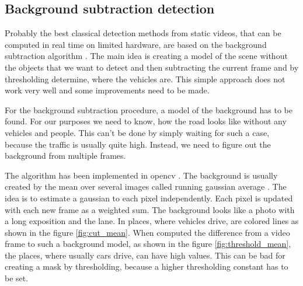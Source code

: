 \documentclass[a4paper,12pt,titlepage, twoside]{article}
\numberwithin{figure}{section}
\begin{document}
\subsection{Background subtraction detection}
\label{sec:bgs}

Probably the best classical detection methods from static videos, that can be computed in real time on limited hardware, are based on the background subtraction algorithm \cite{piccardi2004background}. The main idea is creating a model of the scene without the objects that we want to detect and then subtracting the current frame and by thresholding determine, where the vehicles are. This simple approach does not work very well and some improvements need to be made. 

For the background subtraction procedure, a model of the background has to be found. For our purposes we need to know, how the road looks like without any vehicles and people. This can't be done by simply waiting for such a case, because the traffic is usually quite high. Instead, we need to figure out the background from multiple frames. 

\cite{horprasert1999statistical, zivkovic2006efficient}

The algorithm has been implemented in opencv \cite{opencv}. The background is usually created by the mean over several images called running gaussian average \cite{wren1997pfinder}. The idea is to estimate a gaussian to each pixel independently. Each pixel is updated with each new frame as a weighted sum. The background looks like a photo with a long exposition and the lane. In places, where vehicles drive, are colored lines as shown in the figure \ref{fig:cut_mean}. When computed the difference from a video frame to such a background model, as shown in the figure \ref{fig:threshold_mean}, the places, where usually cars drive, can have high values. This can be bad for creating a mask by thresholding, because a higher thresholding constant has to be set.
\end{document}
